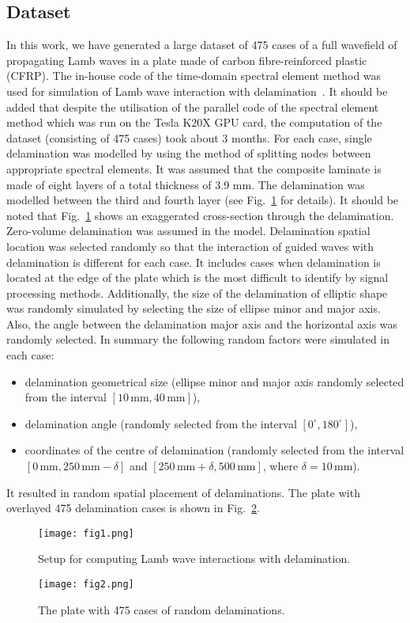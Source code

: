 \subsection{Dataset}
In this work, we have generated a large dataset of 475 cases of a full wavefield of propagating Lamb waves in a plate made of carbon fibre-reinforced plastic (CFRP).
The in-house code of the time-domain spectral element method was used for simulation of Lamb wave interaction with delamination~\cite{Kudela2020}.
It should be added that despite the utilisation of the parallel code of the spectral element method which was run on the Tesla K20X GPU card, the computation of the dataset (consisting of 475 cases) took about 3 months.
For each case, single delamination was modelled by using the method of splitting nodes between appropriate spectral elements. 
It was assumed that the composite laminate is made of eight layers of a total thickness of 3.9 mm.
The delamination was modelled between the third and fourth layer (see Fig.~\ref{fig:plate_setup} for details).
It should be noted that Fig.~\ref{fig:plate_setup} shows an exaggerated cross-section through the delamination. 
Zero-volume delamination was assumed in the model. 
Delamination spatial location was selected randomly so that the interaction of guided waves with delamination is different for each case.
It includes cases when delamination is located at the edge of the plate which is the most difficult to identify by signal processing methods.
Additionally, the size of the delamination of elliptic shape was randomly simulated by selecting the size of ellipse minor and major axis.
Also, the angle between the delamination major axis and the horizontal axis was randomly selected.
In summary the following random factors were simulated in each case:
\begin{itemize}
\item delamination geometrical size	(ellipse minor and major axis randomly selected from the interval \(\left[10 \, \textrm{mm}, 40\, \textrm{mm}\right]\)),
\item delamination angle (randomly selected from the interval \( \left[ 0^{\circ}, 180^{\circ} \right]\)),
\item coordinates of the centre of delamination (randomly selected from the interval \(\left[0\, \textrm{mm}, 250\, \textrm{mm} -\delta \right]\) and \( \left[250\, \textrm{mm}+\delta, 500\, \textrm{mm} \right] \), where \(\delta = 10\, \textrm{mm}\)).
\end{itemize}
It resulted in random spatial placement of delaminations. The plate with overlayed 475 delamination cases is shown in Fig.~\ref{fig:random_delam}.
\begin{figure}
	\centering
	\texttt{[image: fig1.png]}
	\caption{Setup for computing Lamb wave interactions with delamination.}
	\label{fig:plate_setup}
\end{figure}	
\begin{figure}
	\centering
	\texttt{[image: fig2.png]}
	\caption{The plate with 475 cases of random delaminations.}
	\label{fig:random_delam}
\end{figure}
		
